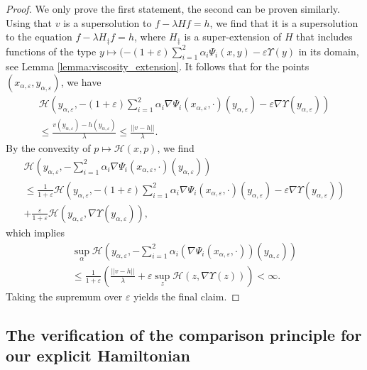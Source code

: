 \documentclass[a4paper]{article}
\newcommand{\cH}{\mathcal{H}}
\newcommand{\vn}[1]{\left| \! \left| #1\right| \! \right|}
\numberwithin{equation}{section}
\theoremstyle{definition}
\begin{document}
\begin{proof} %
	We only prove the first statement, the second can be proven similarly. Using that $v$ is a supersolution to $f - \lambda H f = h$, we find that it is a supersolution to the equation $f - \lambda H_\ddagger f = h$, where $H_\ddagger$ is a super-extension of $H$ that includes functions of the type $y \mapsto (-(1+\varepsilon) \sum_{i=1}^2\alpha_i \Psi_i(x,y)- \varepsilon \Upsilon(y)$ in its domain, see Lemma \ref{lemma:viscosity_extension}. It follows that for the points $(x_{\alpha,\varepsilon},y_{\alpha,\varepsilon})$, we have
	\begin{multline*}
		\cH\left(y_{\alpha,\varepsilon}, - (1+\varepsilon) \sum_{i=1}^2 \alpha_i \nabla \Psi_i(x_{\alpha,\varepsilon},\cdot)(y_{\alpha,\varepsilon}) - \varepsilon \nabla \Upsilon(y_{\alpha,\varepsilon})\right) \\
		\leq \frac{v(y_{\alpha,\varepsilon}) - h(y_{\alpha,\varepsilon})}{\lambda} \leq  \frac{\vn{v-h}}{\lambda}.
	\end{multline*}
	By the convexity of $p \mapsto \cH(x,p)$, we find
	\begin{multline*}
		\cH\left(y_{\alpha,\varepsilon}, -\sum_{i=1}^2\alpha_i \nabla \Psi_i(x_{\alpha,\varepsilon},\cdot)(y_{\alpha,\varepsilon})\right) \\
		\leq \frac{1}{1+\varepsilon} \cH\left(y_{\alpha,\varepsilon},-(1+\varepsilon)\sum_{i=1}^2\alpha_i \nabla \Psi_i(x_{\alpha,\varepsilon},\cdot)(y_{\alpha,\varepsilon}) - \varepsilon \nabla \Upsilon(y_{\alpha,\varepsilon})\right) \\
		+ \frac{\varepsilon}{1+\varepsilon}  \cH\left(y_{\alpha,\varepsilon}, \nabla \Upsilon(y_{\alpha,\varepsilon})\right),
	\end{multline*}
	which implies
	\begin{multline*}
		\sup_{\alpha} \cH\left(y_{\alpha,\varepsilon}, - \sum_{i=1}^2 \alpha_i (\nabla \Psi_i(x_{\alpha,\varepsilon},\cdot))(y_{\alpha,\varepsilon})\right) \\
		\leq \frac{1}{1+\varepsilon}\left( \frac{\vn{v-h}}{\lambda} + \varepsilon \sup_{z} \cH(z,\nabla \Upsilon(z))\right) < \infty.
	\end{multline*}
	Taking the supremum over $\varepsilon$ yields the final claim.
\end{proof}




\subsection{The verification of the comparison principle for our explicit Hamiltonian} \label{section:comparison_explicit}
\end{document}
